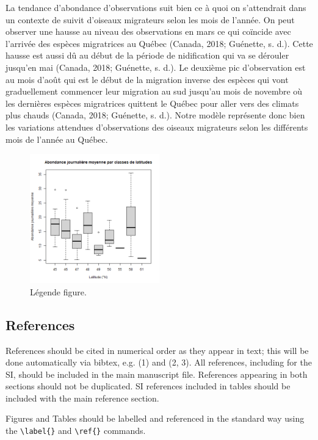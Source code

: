 \documentclass[9pt,twocolumn,twoside,]{pnas-new}
\begin{document}
La tendance d'abondance d'observations suit bien ce à quoi on
s'attendrait dans un contexte de suivit d'oiseaux migrateurs selon les
mois de l'année. On peut observer une hausse au niveau des observations
en mars ce qui coïncide avec l'arrivée des espèces migratrices au Québec
(Canada, 2018; Guénette, s. d.). Cette hausse est aussi dû au début de
la période de nidification qui va se dérouler jusqu'en mai (Canada,
2018; Guénette, s. d.). Le deuxième pic d'observation est au mois d'août
qui est le début de la migration inverse des espèces qui vont
graduellement commencer leur migration au sud jusqu'au mois de novembre
où les dernières espèces migratrices quittent le Québec pour aller vers
des climats plus chauds (Canada, 2018; Guénette, s. d.). Notre modèle
représente donc bien les variations attendues d'observations des oiseaux
migrateurs selon les différents mois de l'année au Québec.

\begin{figure}
\centering
\includegraphics[width=0.5\textwidth,height=0.4\textheight]{"Figure2.png"}
\caption{Légende figure. \label{fig:img1}}
\end{figure}

\hypertarget{references}{%
\subsection*{References}\label{references}}

References should be cited in numerical order as they appear in text;
this will be done automatically via bibtex, e.g. (1) and (2, 3). All
references, including for the SI, should be included in the main
manuscript file. References appearing in both sections should not be
duplicated. SI references included in tables should be included with the
main reference section.

Figures and Tables should be labelled and referenced in the standard way
using the \texttt{\textbackslash{}label\{\}} and
\texttt{\textbackslash{}ref\{\}} commands.
\end{document}
